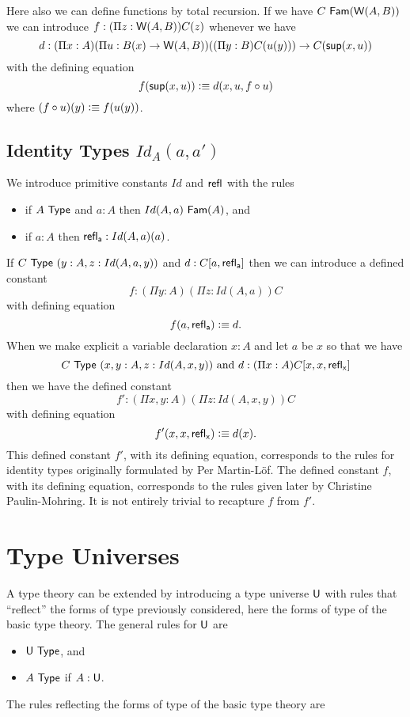 { Here also we can define functions by total recursion. If we have
$C~{\sf Fam}({\sf W}(A,B))$ we can introduce $f:(\Pi z:{\sf W}(A,B))C(z)$ whenever we have
$$
d:(\Pi x:A)(\Pi u:B(x)\rightarrow {\sf W}(A,B))((\Pi y:B)C(u(y)))\rightarrow C({\sf sup}(x,u))
$$
with the defining equation
$$
f({\sf sup}(x,u)) \vcentcolon\equiv d(x,u,f\circ u)
$$
where $(f\circ u)(y) \vcentcolon\equiv f(u(y))$.

\subsection*{Identity Types $Id_A(a,a')$}
We introduce primitive constants $Id$ and ${\sf refl_{}}$ with the rules
\begin{itemize}
\item if $A~{\sf Type}$ and $a:A$ then $Id(A,a)~{\sf Fam}(A)$, and
\item if $a:A$ then ${\sf refl_{a}}:Id(A,a)(a)$.
\end{itemize}
If $C~{\sf Type}~(y:A,z:Id(A,a,y))$ and $d:C[a,{\sf refl_{a}}]$ then we can introduce a defined constant 
  $$f:(\Pi y:A)(\Pi z:Id(A,a))C$$ 
with defining equation
  \[ f(a,{\sf refl_{a}})\vcentcolon\equiv d.\]
When we make explicit a variable declaration $x:A$ 
and let $a$ be $x$ 
so that we have 
  $$C~{\sf Type}~(x,y:A, z:Id(A,x,y))\mbox{ and  }d:(\Pi x:A)C[x,x,{\sf refl_{x}}]$$ 
then we have the defined constant
  $$f':(\Pi x,y:A)(\Pi z:Id(A,x,y))C$$ 
with defining equation
  \[ f'(x,x,{\sf refl_{x}})\vcentcolon\equiv d(x).\]
This defined constant $f'$, with its defining equation, corresponds to the rules for identity types originally formulated by Per Martin-L\"{o}f.   The defined constant $f$, with its defining equation, corresponds to the rules given later by Christine Paulin-Mohring.  It is not entirely trivial to recapture $f$ from $f'$.


\section*{Type Universes}

 A type theory can be extended by introducing a type universe ${\sf U}$ with rules that ``reflect'' the forms of type previously considered, here the forms of type of the basic type theory.  The general rules for ${\sf U}$ are

\begin{itemize}
\item ${\sf U}~{\sf Type}$, and
\item $A~{\sf Type}$ if $A:{\sf U}$.
\end{itemize}

The rules reflecting the forms of type of the basic type theory are

}
